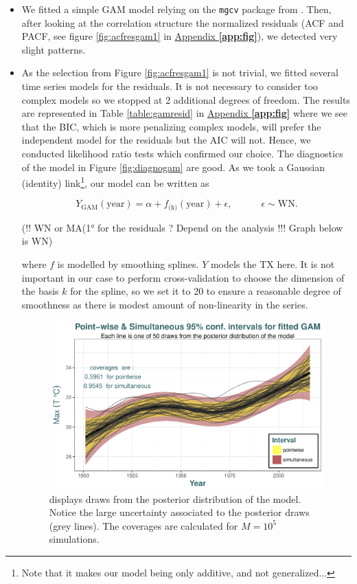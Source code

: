 \begin{itemize}
\item We fitted a simple GAM model relying on the \texttt{mgcv} package from \citet{maindonald_data_2006}. Then, after looking at the correlation structure the normalized residuals (ACF and PACF, see figure \ref{fig:acfresgam1} in \hyperref[app:fig]{Appendix \textbf{\ref{app:fig}}}), we detected very slight patterns.

\item As the selection from Figure \ref{fig:acfresgam1} is not trivial, we fitted several time series models for the residuals. It is not necessary to consider too complex models so we stopped at 2 additional degrees of freedom. The results are represented in Table \ref{table:gamresid} in \hyperref[app:fig]{Appendix \textbf{\ref{app:fig}}} where we see that the BIC, which is more penalizing complex models, will prefer the independent model for the residuals but the AIC will not. Hence, we conducted likelihood ratio tests which confirmed our choice. The diagnostics of the model in Figure \ref{fig:diagnogam} are good. As we took a Gaussian (identity) link\footnote{Note that it makes our model being only additive, and not generalized...}, our model can be written as

\begin{equation}\label{eq:gam}
Y_{\text{GAM}}(\text{year}) = \alpha + f_{\text{(k)}}(\text{year})+\epsilon , \qquad\quad \epsilon\sim\text{WN}.
\end{equation}

(!! WN or MA(1° for the residuals ? Depend on the analysis !!! Graph below is WN)


where $f$ is modelled by smoothing splines. $Y$ models the TX here. It is not important in our case to perform cross-validation to choose the dimension of the basis $k$ for the spline, so we set it to 20 to ensure a reasonable degree of smoothness as there is modest amount of non-linearity in the series.

\begin{figure}[!htb]
\centering	\includegraphics[width=.75\linewidth]{post_draws.pdf}\caption{displays draws from the posterior distribution of the model. Notice the large uncertainty associated to the posterior draws (grey lines).  The coverages are calculated for $M=10^5$ simulations. }\label{fig:post_draws}
\end{figure}


\end{itemize}
